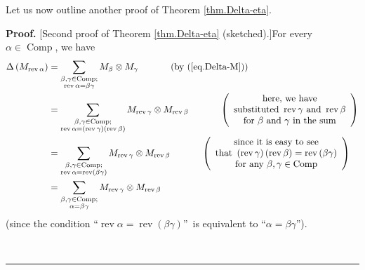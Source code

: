 \documentclass[numbers=enddot,12pt,final,onecolumn,notitlepage]{scrartcl}%
\theoremstyle{definition}
\newenvironment{proof}[1][Proof]{\noindent\textbf{#1.} }{\ \rule{0.5em}{0.5em}}
\let\sumnonlimits\sum
\renewcommand{\sum}{\sumnonlimits\limits}
\newenvironment{vershort}{}{}
\begin{document}
\begin{vershort}
Let us now outline another proof of Theorem \ref{thm.Delta-eta}.

\begin{proof}
[Second proof of Theorem \ref{thm.Delta-eta} (sketched).]For every $\alpha
\in\operatorname*{Comp}$, we have%
\begin{align}
\Delta\left(  M_{\operatorname*{rev}\alpha}\right)   &  =\sum_{\substack{\beta
,\gamma\in\operatorname*{Comp};\\\operatorname*{rev}\alpha=\beta\gamma
}}M_{\beta}\otimes M_{\gamma}\ \ \ \ \ \ \ \ \ \ \left(  \text{by
(\ref{eq.Delta-M})}\right) \nonumber\\
&  =\sum_{\substack{\beta,\gamma\in\operatorname*{Comp};\\\operatorname*{rev}%
\alpha=\left(  \operatorname*{rev}\gamma\right)  \left(  \operatorname*{rev}%
\beta\right)  }}M_{\operatorname*{rev}\gamma}\otimes M_{\operatorname*{rev}%
\beta}\ \ \ \ \ \ \ \ \ \ \left(
\begin{array}
[c]{c}%
\text{here, we have}\\
\text{substituted }\operatorname*{rev}\gamma\text{ and }\operatorname*{rev}%
\beta\\
\text{for }\beta\text{ and }\gamma\text{ in the sum}%
\end{array}
\right) \nonumber\\
&  =\sum_{\substack{\beta,\gamma\in\operatorname*{Comp};\\\operatorname*{rev}%
\alpha=\operatorname*{rev}\left(  \beta\gamma\right)  }}M_{\operatorname*{rev}%
\gamma}\otimes M_{\operatorname*{rev}\beta}\ \ \ \ \ \ \ \ \ \ \left(
\begin{array}
[c]{c}%
\text{since it is easy to see}\\
\text{that }\left(  \operatorname*{rev}\gamma\right)  \left(
\operatorname*{rev}\beta\right)  =\operatorname*{rev}\left(  \beta
\gamma\right) \\
\text{for any }\beta,\gamma\in\operatorname*{Comp}%
\end{array}
\right) \nonumber\\
&  =\sum_{\substack{\beta,\gamma\in\operatorname*{Comp};\\\alpha=\beta\gamma
}}M_{\operatorname*{rev}\gamma}\otimes M_{\operatorname*{rev}\beta}
\label{pf.thm.Delta-eta.short.1}%
\end{align}
(since the condition \textquotedblleft$\operatorname*{rev}\alpha
=\operatorname*{rev}\left(  \beta\gamma\right)  $\textquotedblright\ is
equivalent to \textquotedblleft$\alpha=\beta\gamma$\textquotedblright).


\end{proof}
\end{vershort}
\end{document}
